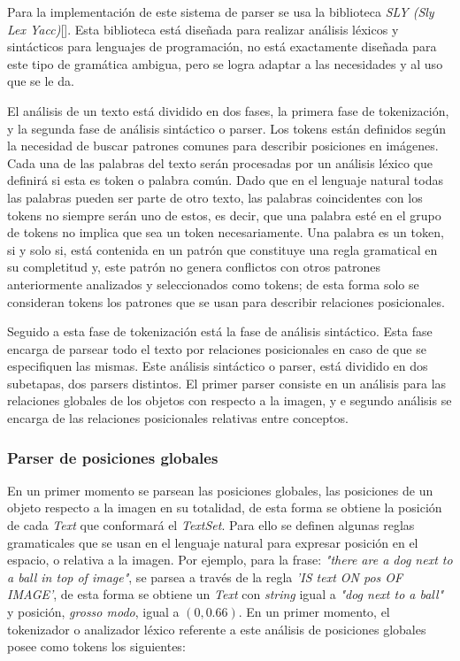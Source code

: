 Para la implementación de este sistema de parser se usa la biblioteca \textit{SLY (Sly Lex Yacc)}[\cite{sly}]. Esta biblioteca está diseñada para realizar análisis léxicos y sintácticos para lenguajes de programación, no está exactamente diseñada para este tipo de gramática ambigua, pero se logra adaptar a las necesidades y al uso que se le da.

El análisis de un texto está dividido en dos fases, la primera fase de tokenización, y la segunda fase de análisis sintáctico o parser. Los tokens están definidos según la necesidad de buscar patrones comunes para describir posiciones en imágenes. Cada una de las palabras del texto serán procesadas por un análisis léxico que definirá si esta es token o palabra común. Dado que en el lenguaje natural todas las palabras pueden ser parte de otro texto, las palabras coincidentes con los tokens no siempre serán uno de estos, es decir, que una palabra esté en el grupo de tokens no implica que sea un token necesariamente. Una palabra es un token, si y solo si, está contenida en un patrón que constituye una regla gramatical en su completitud y, este patr\'on no genera conflictos con otros patrones anteriormente analizados y seleccionados como tokens; de esta forma solo se consideran tokens los patrones que se usan para describir relaciones posicionales. 

Seguido a esta fase de tokenización est\'a la fase de análisis sintáctico. Esta fase encarga de parsear todo el texto por relaciones posicionales en caso de que se especifiquen las mismas. Este análisis sint\'actico o parser, está dividido en dos subetapas, dos parsers distintos. El primer parser consiste en un análisis para las relaciones globales de los objetos con respecto a la imagen, y e segundo análisis se encarga de las relaciones posicionales relativas entre conceptos.

\subsubsection{Parser de posiciones globales}

En un primer momento se parsean las posiciones globales, las posiciones de un objeto respecto a la imagen en su totalidad, de esta forma se obtiene la posición de cada \textit{Text} que conformará el \textit{TextSet}. Para ello se definen algunas reglas gramaticales que se usan en el lenguaje natural para expresar posición en el espacio, o relativa a la imagen. Por ejemplo, para la frase: \textit{"there are a dog next to a ball in top of image"}, se parsea a través de la regla \textit{'IS text ON pos OF IMAGE'}, de esta forma se obtiene un \textit{Text} con \textit{string} igual a \textit{"dog next to a ball"} y posici\'on, \textit{grosso modo}, igual a $(0, 0.66)$. En un primer momento, el tokenizador o analizador léxico referente a este análisis de posiciones globales posee como tokens los siguientes:

